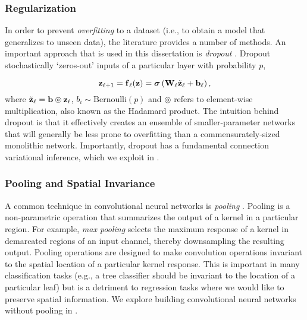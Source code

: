 \subsubsection{Regularization}

In order to prevent \textit{overfitting} to a dataset (i.e., to obtain a model that generalizes to unseen data), the literature provides a number of methods. An important approach that is used in this dissertation is \textit{dropout} \citep{srivastava_dropout_2014}. Dropout stochastically `zeros-out' inputs of a particular layer with probability $p$, 

\begin{equation}
	\boldsymbol{\mathbf{z}}_{\ell+1} = \boldsymbol{\mathbf{f}}_\ell(\boldsymbol{\mathbf{z}}) = \boldsymbol{\mathbf{\sigma}}\left(\boldsymbol{\mathbf{W}}_\ell\tilde{\boldsymbol{\mathbf{z}}}_\ell + \boldsymbol{\mathbf{b}}_\ell\right),
\end{equation}
where $\tilde{\boldsymbol{\mathbf{z}}}_\ell = \boldsymbol{\mathbf{b}} \circledcirc \boldsymbol{\mathbf{z}}_\ell$, $b_i \sim \text{Bernoulli}(p)$ and $\circledcirc$ refers to element-wise multiplication, also known as the Hadamard product.
The intuition behind dropout is that it effectively creates an ensemble of smaller-parameter networks that will generally be less prone to overfitting than a commensurately-sized monolithic network. Importantly, dropout has a fundamental connection variational inference, which we exploit in .
\subsubsection{Pooling and Spatial Invariance}
A common technique in convolutional neural networks is \textit{pooling} \citep{Goodfellow-et-al-2016}. Pooling is a non-parametric operation that summarizes the output of a kernel in a particular region. For example, \textit{max pooling} selects the maximum response of a kernel in demarcated regions of an input channel, thereby downsampling the resulting output. Pooling operations are designed to make convolution operations invariant to the spatial location of a particular kernel response. This is important in many classification tasks (e.g., a tree classifier should be invariant to the location of a particular leaf) but is a detriment to regression tasks where we would like to preserve spatial information. We explore building convolutional neural networks without pooling in .



 